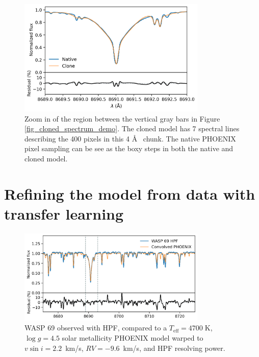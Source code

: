 \documentclass[modern]{aastex631}
\begin{document}
\begin{figure}[hbt!]
    \centering
    \includegraphics[width=0.8\textwidth]{figures/blase_clone_demo_zoom.png}
    \caption{Zoom in of the region between the vertical gray bars in Figure \ref{fig_cloned_spectrum_demo}. The cloned model has 7 spectral lines describing the 400 pixels in this 4 \AA~ chunk.  The native PHOENIX pixel sampling can be see as the boxy steps in both the native and cloned model.  }
    \label{fig_zoom_cloning_performance}
\end{figure}


\section{Refining the model from data with transfer learning}

\begin{figure}[hbt!]
    \centering
    \includegraphics[width=0.8\textwidth]{figures/blase_WASP69_demo.png}
    \caption{WASP 69 observed with HPF, compared to a $T_{\mathrm{eff}}=4700\;$K,  $\log{g}=4.5$ solar metallicity PHOENIX model warped to $v\sin{i}=2.2$~km/s, $RV=-9.6$~km/s, and HPF resolving power.}
    \label{fig_WASP69_demo}
\end{figure}
\end{document}
